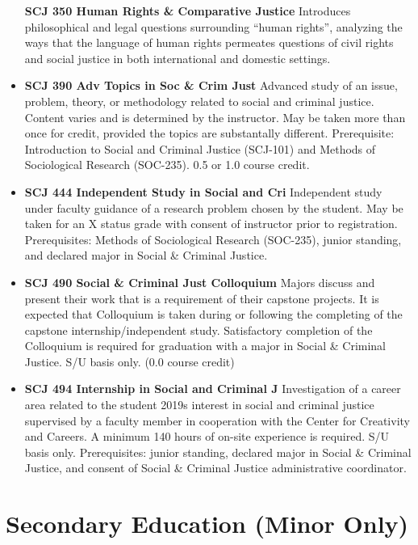 \documentclass[
  letterpaper,
]{scrbook}
\begin{document}
\begin{itemize}
  \textbf{SCJ 350 Human Rights \& Comparative Justice} Introduces
  philosophical and legal questions surrounding ``human rights'',
  analyzing the ways that the language of human rights permeates
  questions of civil rights and social justice in both international and
  domestic settings.
\item
  \textbf{SCJ 390 Adv Topics in Soc \& Crim Just} Advanced study of an
  issue, problem, theory, or methodology related to social and criminal
  justice. Content varies and is determined by the instructor. May be
  taken more than once for credit, provided the topics are substantally
  different. Prerequisite: Introduction to Social and Criminal Justice
  (SCJ-101) and Methods of Sociological Research (SOC-235). 0.5 or 1.0
  course credit.\\
\item
  \textbf{SCJ 444 Independent Study in Social and Cri} Independent study
  under faculty guidance of a research problem chosen by the student.
  May be taken for an X status grade with consent of instructor prior to
  registration. Prerequisites: Methods of Sociological Research
  (SOC-235), junior standing, and declared major in Social \& Criminal
  Justice.
\item
  \textbf{SCJ 490 Social \& Criminal Just Colloquium} Majors discuss and
  present their work that is a requirement of their capstone projects.
  It is expected that Colloquium is taken during or following the
  completing of the capstone internship/independent study. Satisfactory
  completion of the Colloquium is required for graduation with a major
  in Social \& Criminal Justice. S/U basis only. (0.0 course credit)
\item
  \textbf{SCJ 494 Internship in Social and Criminal J} Investigation of
  a career area related to the student 2019s interest in social and
  criminal justice supervised by a faculty member in cooperation with
  the Center for Creativity and Careers. A minimum 140 hours of on-site
  experience is required. S/U basis only. Prerequisites: junior
  standing, declared major in Social \& Criminal Justice, and consent of
  Social \& Criminal Justice administrative coordinator.
\end{itemize}

\hypertarget{secondary-education-minor-only}{%
\section{Secondary Education (Minor
Only)}\label{secondary-education-minor-only}}
\end{document}
